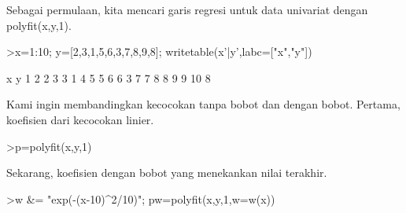 \documentclass[a4paper,10pt]{article}
\begin{document}
\begin{eulernotebook}
\begin{eulercomment}
\begin{eulercomment}
\begin{eulercomment}
\begin{eulercomment}
\begin{eulercomment}
\begin{eulercomment}
\begin{eulercomment}
\begin{eulercomment}
\begin{eulercomment}
\begin{eulercomment}
\begin{eulercomment}
\begin{eulercomment}
\begin{eulercomment}
\begin{eulercomment}
\begin{eulercomment}
\begin{eulercomment}
\begin{eulercomment}
\begin{eulercomment}
\begin{eulercomment}
\begin{eulercomment}
\begin{eulercomment}
\begin{eulercomment}
\begin{eulercomment}
\begin{eulercomment}
\begin{eulercomment}
\begin{eulercomment}
\begin{eulercomment}
\begin{eulercomment}
\begin{eulercomment}
\begin{eulercomment}
\begin{eulercomment}
\begin{eulercomment}
\begin{eulercomment}
\begin{eulercomment}
\begin{eulercomment}
\begin{eulercomment}
\begin{eulercomment}
\begin{eulercomment}
\begin{eulercomment}
\begin{eulercomment}
\begin{eulercomment}
\begin{eulercomment}
\begin{eulercomment}
\begin{eulercomment}
\begin{eulercomment}
Sebagai permulaan, kita mencari garis regresi untuk data univariat
dengan polyfit(x,y,1).
\end{eulercomment}
\begin{eulerprompt}
>x=1:10; y=[2,3,1,5,6,3,7,8,9,8]; writetable(x'|y',labc=["x","y"])
\end{eulerprompt}
\begin{euleroutput}
           x         y
           1         2
           2         3
           3         1
           4         5
           5         6
           6         3
           7         7
           8         8
           9         9
          10         8
\end{euleroutput}
\begin{eulercomment}
Kami ingin membandingkan kecocokan tanpa bobot dan dengan bobot.
Pertama, koefisien dari kecocokan linier.
\end{eulercomment}
\begin{eulerprompt}
>p=polyfit(x,y,1)
\end{eulerprompt}
\begin{euleroutput}
  [0.733333,  0.812121]
\end{euleroutput}
\begin{eulercomment}
Sekarang, koefisien dengan bobot yang menekankan nilai terakhir.
\end{eulercomment}
\begin{eulerprompt}
>w &= "exp(-(x-10)^2/10)"; pw=polyfit(x,y,1,w=w(x))
\end{eulerprompt}

\end{eulercomment}
\end{eulercomment}
\end{eulercomment}
\end{eulercomment}
\end{eulercomment}
\end{eulercomment}
\end{eulercomment}
\end{eulercomment}
\end{eulercomment}
\end{eulercomment}
\end{eulercomment}
\end{eulercomment}
\end{eulercomment}
\end{eulercomment}
\end{eulercomment}
\end{eulercomment}
\end{eulercomment}
\end{eulercomment}
\end{eulercomment}
\end{eulercomment}
\end{eulercomment}
\end{eulercomment}
\end{eulercomment}
\end{eulercomment}
\end{eulercomment}
\end{eulercomment}
\end{eulercomment}
\end{eulercomment}
\end{eulercomment}
\end{eulercomment}
\end{eulercomment}
\end{eulercomment}
\end{eulercomment}
\end{eulercomment}
\end{eulercomment}
\end{eulercomment}
\end{eulercomment}
\end{eulercomment}
\end{eulercomment}
\end{eulercomment}
\end{eulercomment}
\end{eulercomment}
\end{eulercomment}
\end{eulercomment}
\end{eulernotebook}
\end{document}
